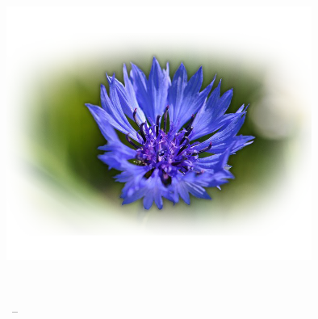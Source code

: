 
\begin{titlepage}

\begin{addmargin}[-1cm]{-3cm}
\begin{center}
\large

\hfill
\vfill

\begingroup
\color{MidnightBlue}\spacedallcaps{\Huge{\myTitle}} \\ \bigskip %
\endgroup

\spacedlowsmallcaps{\myName} %

\vfill

\includegraphics[width=10cm]{img/Estonian_Flower.png} \\ \medskip %

\mySubtitle \\ \medskip %

\myTime\ -- \myVersion %

\vfill

\end{center}
\end{addmargin}

\end{titlepage}
